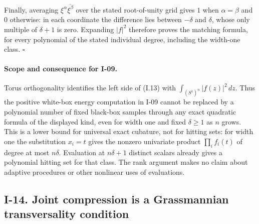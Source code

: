 \documentclass[11pt,a4paper]{article}
\theoremstyle{definition}\newtheorem{definition}{Definition}
\begin{document}
Finally, averaging $\xi^\alpha\overline{\xi^\beta}$ over the stated
root-of-unity grid gives $1$ when $\alpha=\beta$ and $0$ otherwise:
in each coordinate the difference lies between $-\delta$ and
$\delta$, whose only multiple of $\delta+1$ is zero.  Expanding
$|f|^2$ therefore proves the matching formula, for every polynomial
of the stated individual degree, including the width-one class.
\hfill$\square$

\paragraph{Scope and consequence for I-09.}
Torus orthogonality identifies the left side of (I.13) with
$\int_{(S^1)^n}|f(z)|^2\,dz$.  Thus the positive white-box energy
computation in I-09 cannot be replaced by a polynomial number of
fixed black-box samples through any exact quadratic formula of the
displayed kind, even for width one and fixed $\delta\ge1$ as $n$ grows.
This is a lower bound for universal exact cubature, not for hitting
sets: for width one the substitution $x_i=t$ gives the nonzero
univariate product $\prod_i f_i(t)$ of degree at most $n\delta$.
Evaluation at $n\delta+1$ distinct scalars already gives a polynomial
hitting set for that class.  The rank argument makes no claim about
adaptive procedures or other nonlinear uses of evaluations.

\subsection{I-14. Joint compression is a Grassmannian transversality condition}
\label{I-14}
\end{document}
